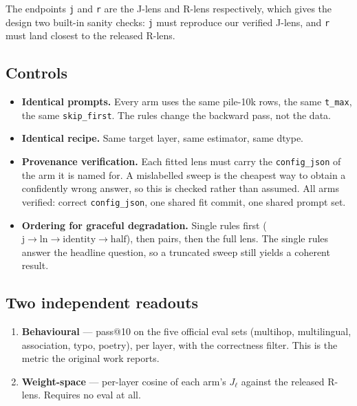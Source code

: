 \documentclass[11pt,a4paper]{article}
\newcommand{\jlens}{J\nobreakdash-lens}
\newcommand{\rlens}{R\nobreakdash-lens}
\newcommand{\cfg}[1]{\texttt{#1}}
\begin{document}
The endpoints \cfg{j} and \cfg{r} are the \jlens{} and \rlens{} respectively, which
gives the design two built-in sanity checks: \cfg{j} must reproduce our verified
\jlens, and \cfg{r} must land closest to the released \rlens.

\subsection{Controls}

\begin{itemize}[leftmargin=1.4em]
  \item \textbf{Identical prompts.} Every arm uses the same pile-10k rows, the same
        \texttt{t\_max}, the same \texttt{skip\_first}. The rules change the backward
        pass, not the data.
  \item \textbf{Identical recipe.} Same target layer, same estimator, same dtype.
  \item \textbf{Provenance verification.} Each fitted lens must carry the
        \texttt{config\_json} of the arm it is named for. A mislabelled sweep is the
        cheapest way to obtain a confidently wrong answer, so this is checked rather
        than assumed. All arms verified: correct \texttt{config\_json}, one shared
        fit commit, one shared prompt set.
  \item \textbf{Ordering for graceful degradation.} Single rules first
        ($\text{j} \to \text{ln} \to \text{identity} \to \text{half}$), then pairs,
        then the full lens. The single rules answer the headline question, so a
        truncated sweep still yields a coherent result.
\end{itemize}

\subsection{Two independent readouts}

\begin{enumerate}[leftmargin=1.4em]
  \item \textbf{Behavioural} --- pass@10 on the five official eval sets (multihop,
        multilingual, association, typo, poetry), per layer, with the correctness
        filter. This is the metric the original work reports.
  \item \textbf{Weight-space} --- per-layer cosine of each arm's $J_\ell$ against the
        released \rlens. Requires no eval at all.
\end{enumerate}
\end{document}
